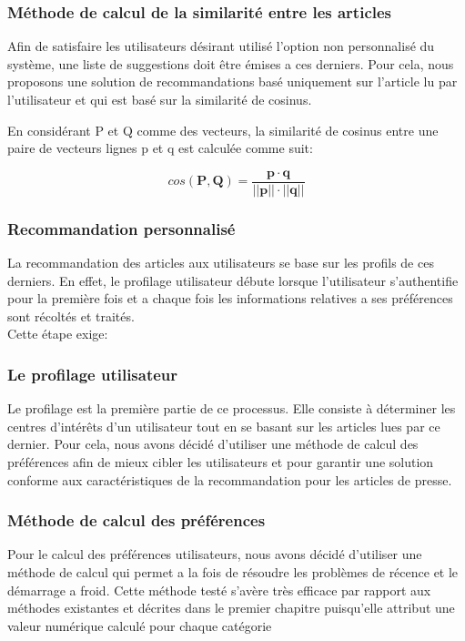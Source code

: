 \subsubsection{Méthode de calcul de la similarité entre les articles}
Afin de satisfaire les utilisateurs désirant utilisé l'option non personnalisé du système, une liste de suggestions doit être émises a ces derniers. Pour cela, nous proposons une solution de recommandations basé uniquement sur l'article lu par l'utilisateur et qui est basé sur la similarité de cosinus.

En considérant P et Q comme des vecteurs, la similarité de cosinus entre une paire de vecteurs lignes p et q est calculée comme suit:

                                      \[cos(\pmb P, \pmb Q) = \frac {\pmb p \cdot \pmb q}{||\pmb p|| \cdot ||\pmb q||}\]


\subsubsection{Recommandation personnalisé}
La recommandation des articles aux utilisateurs se base sur les profils de ces derniers. En effet, le profilage utilisateur débute lorsque l'utilisateur s'authentifie pour la première fois et a chaque fois les informations relatives a ses préférences sont récoltés et traités.\\
Cette étape exige:

\subsubsection{Le profilage utilisateur}
Le profilage est la première partie de ce processus. Elle consiste à déterminer les centres d’intérêts d’un utilisateur tout en se basant sur les articles lues par ce dernier. Pour cela, nous avons décidé d’utiliser une méthode de calcul des préférences afin de mieux cibler les utilisateurs et pour garantir une solution conforme aux caractéristiques de la recommandation pour les articles de presse.

\subsubsection{Méthode de calcul des préférences}
Pour le calcul des préférences utilisateurs, nous avons décidé d'utiliser une méthode de calcul qui permet a la fois de résoudre les problèmes de récence et le démarrage a froid. Cette méthode testé s'avère très efficace par rapport aux méthodes existantes et décrites dans le premier chapitre puisqu'elle attribut une valeur numérique calculé pour chaque catégorie


